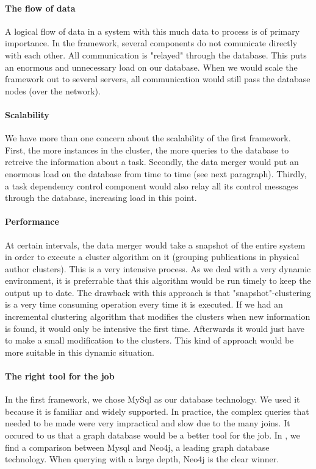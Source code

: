 \paragraph{The flow of data} A logical flow of data in a system with this much data to process is of primary importance. In the framework, several components do not comunicate directly with each other. All communication is "relayed" through the database. This puts an enormous and unnecessary load on our database. When we would scale the framework out to several servers, all communication would still pass the database nodes (over the network).

\paragraph{Scalability} We have more than one concern about the scalability of the first framework. First, the more instances in the cluster, the more queries to the database to retreive the information about a task. Secondly, the data merger would put an enormous load on the database from time to time (see next paragraph). Thirdly, a task dependency control component would also relay all its control messages through the database, increasing load in this point.

\paragraph{Performance} At certain intervals, the data merger would take a snapshot of the entire system in order to execute a cluster algorithm on it (grouping publications in physical author clusters). This is a very intensive process. As we deal with a very dynamic environment, it is preferrable that this algorithm would be run timely to keep the output up to date. The drawback with this approach is that "snapshot"-clustering is a very time consuming operation every time it is executed. If we had an incremental clustering algorithm that modifies the clusters when new information is found, it would only be intensive the first time. Afterwards it would just have to make a small modification to the clusters. This kind of approach would be more suitable in this dynamic situation.

\paragraph{The right tool for the job} In the first framework, we chose MySql as our database technology. We used it because it is familiar and widely supported. In practice, the complex queries that needed to be made were very impractical and slow due to the many joins. It occured to us that a graph database would be a better tool for the job. In \cite{vicknair2010comparison}, we find a comparison between Mysql and Neo4j, a leading graph database technology. When querying with a large depth, Neo4j is the clear winner.

